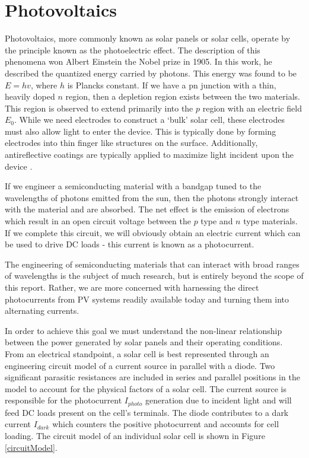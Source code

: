 \section{Photovoltaics}
Photovoltaics, more commonly known as solar panels or solar cells, operate by the principle known as the photoelectric effect. The description of this phenomena won Albert Einstein the Nobel prize in 1905. In this work, he described the quantized energy carried by photons. This energy was found to be $E=hv$, where $h$ is Plancks constant. If we have a pn junction with a thin, heavily doped $n$ region, then a depletion region exists between the two materials. This region is observed to extend primarily into the $p$ region with an electric field $E_0$. While we need electrodes to construct a `bulk' solar cell, these electrodes must also allow light to enter the device. This is typically done by forming electrodes into thin finger like structures on the surface. Additionally, antireflective coatings are typically applied to maximize light incident upon the device \cite{materials}.

If we engineer a semiconducting material with a bandgap tuned to the wavelengths of photons emitted from the sun, then the photons strongly interact with the material and are absorbed. The net effect is the emission of electrons which result in an open circuit voltage between the $p$ type and $n$ type materials. If we complete this circuit, we will obviously obtain an electric current which can be used to drive DC loads - this current is known as a photocurrent. 

The engineering of semiconducting materials that can interact with broad ranges of wavelengths is the subject of much research, but is entirely beyond the scope of this report. Rather, we are more concerned with harnessing the direct photocurrents from PV systems readily available today and turning them into alternating currents. 

In order to achieve this goal we must understand the non-linear relationship between the power generated by solar panels and their operating conditions. From an electrical standpoint, a solar cell is best represented through an engineering circuit model of a current source in parallel with a diode. Two significant parasitic resistances are included in series and parallel positions in the model to account for the physical factors of a solar cell. The current source is responsible for the photocurrent $I_{photo}$ generation due to incident light and will feed DC loads present on the cell's terminals. The diode contributes to a dark current $I_{dark}$ which counters the positive photocurrent and accounts for cell loading. The circuit model of an individual solar cell is shown in Figure \ref{circuitModel}. \cite{soteris}

